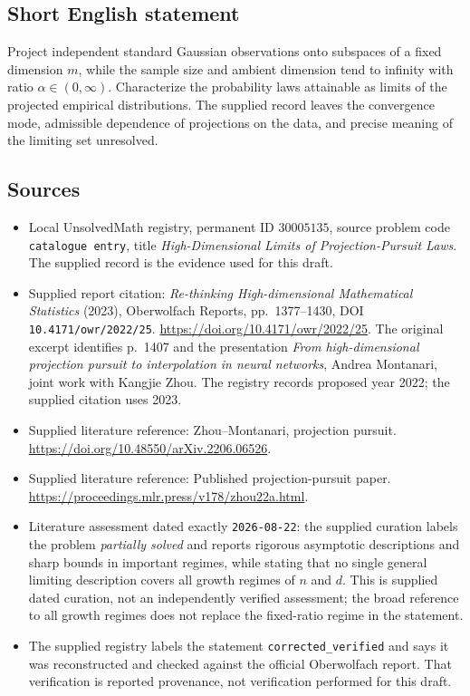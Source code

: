 \documentclass[11pt]{article}
\begin{document}
\subsection{Short English statement}
Project independent standard Gaussian observations onto subspaces of a fixed dimension \(m\), while the sample size and ambient dimension tend to infinity with ratio \(\alpha\in(0,\infty)\). Characterize the probability laws attainable as limits of the projected empirical distributions. The supplied record leaves the convergence mode, admissible dependence of projections on the data, and precise meaning of the limiting set unresolved.
\subsection{Sources}
\begin{itemize}
\item Local UnsolvedMath registry, permanent ID \(30005135\), source problem code \texttt{catalogue entry}, title \emph{High-Dimensional Limits of Projection-Pursuit Laws}. The supplied record is the evidence used for this draft.
\item Supplied report citation: \emph{Re-thinking High-dimensional Mathematical Statistics} (2023), Oberwolfach Reports, pp.\ 1377--1430, DOI \texttt{10.4171/owr/2022/25}. \url{https://doi.org/10.4171/owr/2022/25}. The original excerpt identifies p.\ 1407 and the presentation \emph{From high-dimensional projection pursuit to interpolation in neural networks}, Andrea Montanari, joint work with Kangjie Zhou. The registry records proposed year 2022; the supplied citation uses 2023.
\item Supplied literature reference: Zhou--Montanari, projection pursuit. \url{https://doi.org/10.48550/arXiv.2206.06526}.
\item Supplied literature reference: Published projection-pursuit paper. \url{https://proceedings.mlr.press/v178/zhou22a.html}.
\item Literature assessment dated exactly \texttt{2026-08-22}: the supplied curation labels the problem \emph{partially solved} and reports rigorous asymptotic descriptions and sharp bounds in important regimes, while stating that no single general limiting description covers all growth regimes of \(n\) and \(d\). This is supplied dated curation, not an independently verified assessment; the broad reference to all growth regimes does not replace the fixed-ratio regime in the statement.
\item The supplied registry labels the statement \texttt{corrected\_verified} and says it was reconstructed and checked against the official Oberwolfach report. That verification is reported provenance, not verification performed for this draft.
\end{itemize}
\end{document}
